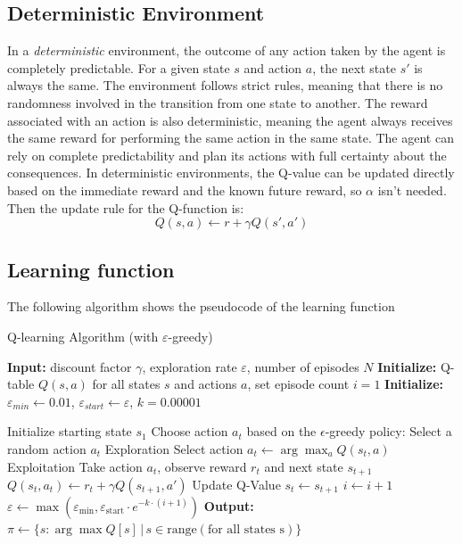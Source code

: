 \subsection{Deterministic Environment}
In a \textit{deterministic} environment, the outcome of any action taken by the agent is completely predictable.
For a given state \( s \) and action \( a \), the next state \( s' \) is always the same. 
The environment follows strict rules, meaning that there is no randomness involved in the transition from one state to another.
The reward associated with an action is also deterministic, meaning the agent always receives the same reward for performing the same action in the same state.
The agent can rely on complete predictability and plan its actions with full certainty about the consequences.
In deterministic environments, the Q-value can be updated directly based on the immediate reward and the known future reward, so \( \alpha \) isn't needed. 
Then the update rule for the Q-function is:
\begin{equation}
Q(s, a) \leftarrow r + \gamma  Q(s', a')
\label{deteministic_q_function}
\end{equation}

\subsection{Learning function}
The following algorithm shows the pseudocode of the learning function
\begin{algorithm}[H]
    \caption{Q-learning Algorithm (with $\varepsilon$-greedy)}
    \begin{algorithmic}[1]
    \State \textbf{Input:} discount factor $\gamma$, exploration rate $\varepsilon$, number of episodes $N$
    \State \textbf{Initialize:} Q-table $Q(s, a)$ for all states $s$ and actions $a$, set episode count $i = 1$
    \State \textbf{Initialize:} $\varepsilon_{min} \leftarrow 0.01$, $\varepsilon_{start} \leftarrow \varepsilon$, $k = 0.00001$
    
        \State Initialize starting state $s_1$
            \State Choose action $a_t$ based on the $\epsilon$-greedy policy:
                \State Select a random action $a_t$ \Comment Exploration
            \Else
                \State Select action $a_t \leftarrow \arg\max_{a} Q(s_t, a)$ \Comment Exploitation
            \EndIf
            \State Take action $a_t$, observe reward $r_t$ and next state $s_{t+1}$
            \State $Q(s_t, a_t) \leftarrow r_t + \gamma Q(s_{t+1}, a')$ \Comment Update Q-Value
            \State $s_t \leftarrow s_{t+1}$
        \EndWhile
        \State $i \leftarrow i + 1$
        \State $\varepsilon \leftarrow \max\left(\varepsilon_{\text{min}}, \varepsilon_{\text{start}} \cdot e^{-k \cdot (i+1)}\right)$
    \EndWhile
    \State \textbf{Output:} $\pi \leftarrow \{s : \arg\max Q[s] \, | \, s \in \text{range}(\text{for all states s})\}$
\end{algorithmic}
\end{algorithm}

